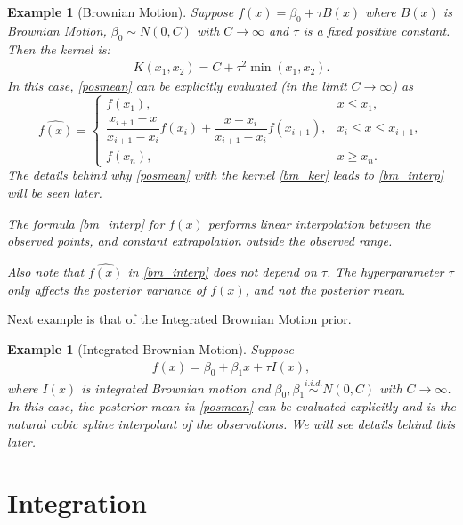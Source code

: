 \documentclass{scrartcl}
\newtheorem{example}[theorem]{Example}
\begin{document}
\begin{example}[Brownian Motion]
  Suppose $f(x) = \beta_0 + \tau B(x)$ where $B(x)$ is Brownian
  Motion, $\beta_0 \sim N(0, C)$ with $C \rightarrow \infty$ and
  $\tau$ is a fixed positive constant. Then the kernel is:
  \begin{align}\label{bm_ker}
    K(x_1, x_2) = C + \tau^2 \min(x_1, x_2). 
  \end{align}
  In this case, \eqref{posmean} can be explicitly evaluated (in the
  limit $C \rightarrow \infty$) as
\begin{equation}\label{bm_interp}
\widehat{f(x)}=
\begin{cases}
f(x_1), & x \le x_1, \\[6pt]
\dfrac{x_{i+1}-x}{x_{i+1}-x_i} f(x_i)
+
\dfrac{x-x_i}{x_{i+1}-x_i} f(x_{i+1}),
& x_i \le x \le x_{i+1}, \\[10pt]
f(x_n), & x \ge x_n .
\end{cases}
\end{equation}
The details behind why \eqref{posmean} with the kernel \eqref{bm_ker}
leads to \eqref{bm_interp} will be seen later. 

The formula \eqref{bm_interp} for $\widehat{f(x)}$  performs linear
interpolation 
between the observed points, and constant extrapolation outside the
observed range.

Also note that $\widehat{f(x)}$ in \eqref{bm_interp} does not depend
on $\tau$. The 
hyperparameter $\tau$ only affects the posterior variance of $f(x)$,
and not the posterior mean. 
\end{example}

Next example is that of the Integrated Brownian Motion prior. 

\begin{example}[Integrated Brownian Motion]
  Suppose
\begin{align}\label{ibmp}
f(x)=\beta_0+\beta_1 x+\tau I(x),
\end{align}
where $I(x)$ is integrated Brownian motion and $\beta_0,\beta_1
\stackrel{i.i.d.}{\sim}N(0,C)$ with $C\to\infty$. In this case, the
posterior mean in \eqref{posmean} can be evaluated explicitly and is
the natural cubic spline interpolant of the observations. We will see
details behind this later. 
\end{example}

\section{Integration}
\end{document}

